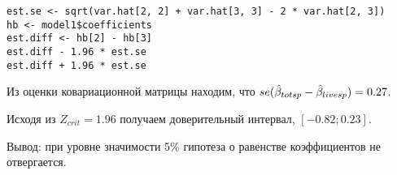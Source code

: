 \begin{problem}
\begin{sol}

\begin{verbatim}
est.se <- sqrt(var.hat[2, 2] + var.hat[3, 3] - 2 * var.hat[2, 3])
hb <- model1$coefficients
est.diff <- hb[2] - hb[3]
est.diff - 1.96 * est.se
est.diff + 1.96 * est.se
\end{verbatim}

Из оценки ковариационной матрицы находим, что $se(\hat{\beta}_{totsp} - \hat{\beta}_{livesp})=0.27$.

Исходя из $Z_{crit}=1.96$ получаем доверительный интервал, $[-0.82; 0.23]$.

Вывод: при уровне значимости 5\% гипотеза о равенстве коэффициентов не отвергается.
\end{sol}
\end{problem}






